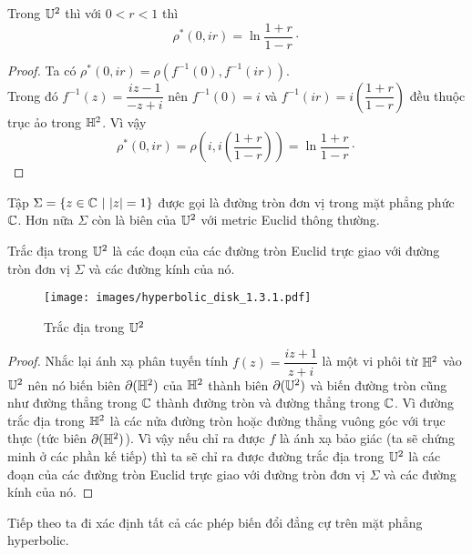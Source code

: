 \begin{lem}\label{lem 2.3.4}
    Trong $\mathbb{U}^2$ thì với $0 < r< 1$ thì 
    \[\rho^*(0, ir)= \ln{\dfrac{1+r}{1-r}}\cdot\]
\end{lem}
\begin{proof}
    Ta có $\rho^*(0, ir) = \rho(f^{-1}(0), f^{-1}(ir))$.\\
    Trong đó $f^{-1}(z) = \dfrac{iz-1}{-z+i}$ nên $f^{-1}(0) = i$ và $f^{-1}(ir) = i\left(\dfrac{1+r}{1-r}\right)$ đều thuộc trục ảo trong $\mathbb{H}^2$. Vì vậy
    \[\rho^*(0,ir) = \rho\left(i, i\left(\dfrac{1+r}{1-r}\right)\right) = \ln{\dfrac{1+r}{1-r}}\cdot\]
\end{proof}
\begin{defn}
    Tập $\Sigma = \{z \in \mathbb{C}~|~|z| =1 \}$ được gọi là đường tròn đơn vị trong mặt phẳng phức $\mathbb{C}$. Hơn nữa $\Sigma$ còn là biên của $\mathbb{U}^2$ với metric Euclid thông thường.
\end{defn}

\begin{thm}
    Trắc địa trong $\mathbb{U}^2$ là các đoạn của các đường tròn Euclid trực giao với đường tròn đơn vị $\Sigma$ và các đường kính của nó.
    \begin{figure}[h]
        \centering
        \texttt{[image: images/hyperbolic\_disk\_1.3.1.pdf]}
        \caption{Trắc địa trong $\mathbb{U}^2$}
    \end{figure}
\end{thm}
\begin{proof}
    Nhắc lại ánh xạ phân tuyến tính $f(z)= \dfrac{iz+1}{z+i}$ là một vi phôi từ $\mathbb{H}^2$ vào $\mathbb{U}^2$ nên nó biến biên $\partial(\mathbb{H}^2)$ của $\mathbb{H}^2$ thành biên $\partial(\mathbb{U}^2)$ và biến đường tròn cũng như đường thẳng trong $\mathbb{C}$ thành đường tròn và đường thẳng trong $\mathbb{C}$. Vì đường trắc địa trong $\mathbb{H}^2$ là các nửa đường tròn hoặc đường thẳng vuông góc với trục thực (tức biên $\partial(\mathbb{H}^2)$). Vì vậy nếu chỉ ra được $f$ là ánh xạ bảo giác (ta sẽ chứng minh ở các phần kế tiếp) thì ta sẽ chỉ ra được đường trắc địa trong $\mathbb{U}^2$ là các đoạn của các đường tròn Euclid trực giao với đường tròn đơn vị $\Sigma$ và các đường kính của nó.
\end{proof}
Tiếp theo ta đi xác định tất cả các phép biến đổi đẳng cự trên mặt phẳng hyperbolic.

